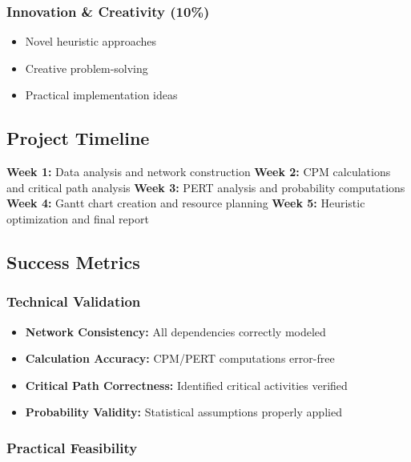 \documentclass[
  letterpaper,
  DIV=11,
  numbers=noendperiod]{scrreprt}
\providecommand{\tightlist}{%
  \setlength{\itemsep}{0pt}\setlength{\parskip}{0pt}}
\begin{document}
\subsubsection{Innovation \& Creativity
(10\%)}\label{innovation-creativity-10}

\begin{itemize}
\tightlist
\item
  Novel heuristic approaches
\item
  Creative problem-solving
\item
  Practical implementation ideas
\end{itemize}

\subsection{Project Timeline}\label{project-timeline}

\textbf{Week 1:} Data analysis and network construction \textbf{Week 2:}
CPM calculations and critical path analysis \textbf{Week 3:} PERT
analysis and probability computations \textbf{Week 4:} Gantt chart
creation and resource planning \textbf{Week 5:} Heuristic optimization
and final report

\subsection{Success Metrics}\label{success-metrics}

\subsubsection{Technical Validation}\label{technical-validation}

\begin{itemize}
\tightlist
\item
  \textbf{Network Consistency:} All dependencies correctly modeled
\item
  \textbf{Calculation Accuracy:} CPM/PERT computations error-free
\item
  \textbf{Critical Path Correctness:} Identified critical activities
  verified
\item
  \textbf{Probability Validity:} Statistical assumptions properly
  applied
\end{itemize}

\subsubsection{Practical Feasibility}\label{practical-feasibility}
\end{document}
